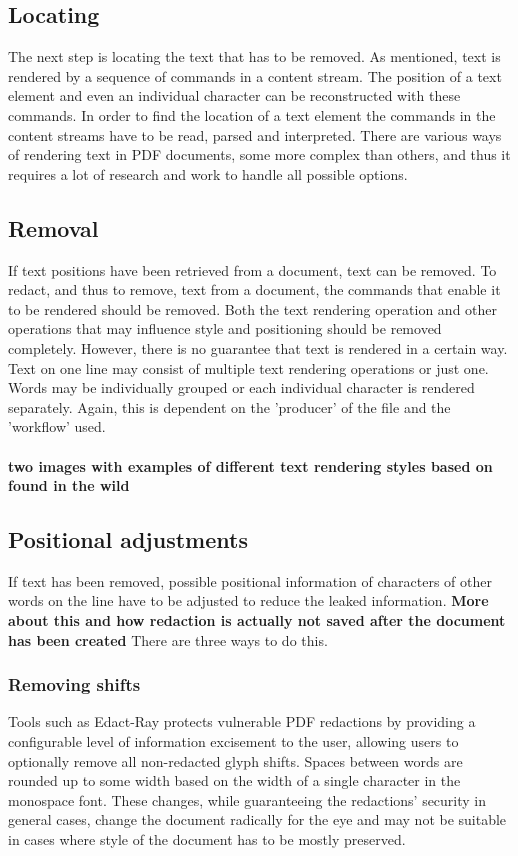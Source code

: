 \subsection{Locating}
The next step is locating the text that has to be removed. As mentioned, text is rendered by a sequence of commands in a content stream. The position of a text element and even an individual character can be reconstructed with these commands. In order to find the location of a text element the commands in the content streams have to be read, parsed and interpreted. There are various ways of rendering text in PDF documents, some more complex than others, and thus it requires a lot of research and work to handle all possible options. 
\subsection{Removal}
If text positions have been retrieved from a document, text can be removed. To redact, and thus to remove, text from a document, the commands that enable it to be rendered should be removed. Both the text rendering operation and other operations that may influence style and positioning should be removed completely. However, there is no guarantee that text is rendered in a certain way. Text on one line may consist of multiple text rendering operations or just one. Words may be individually grouped or each individual character is rendered separately. Again, this is dependent on the 'producer' of the file and the 'workflow' used. 
\\\\
\textbf{two images with examples of different text rendering styles based on found in the wild}
\subsection{Positional adjustments}
If text has been removed, possible positional information of characters of other words on the line have to be adjusted to reduce the leaked information. \textbf{More about this and how redaction is actually not saved after the document has been created} There are three ways to do this.
\subsubsection{Removing shifts}
Tools such as Edact-Ray protects vulnerable PDF redactions by providing a configurable level of information excisement to the user, allowing users to optionally remove all non-redacted glyph shifts. Spaces between words are rounded up to some width based on the width of a single character in the monospace font. These changes, while guaranteeing the redactions' security in general cases, change the document radically for the eye and may not be suitable in cases where style of the document has to be mostly preserved. 

